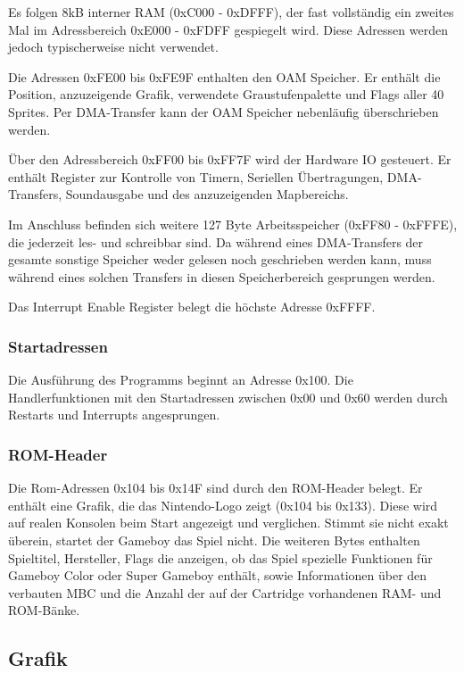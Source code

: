 \documentclass[a4paper]{scrartcl}
\begin{document}
Es folgen 8kB interner RAM (0xC000 - 0xDFFF), der fast vollständig ein zweites Mal im Adressbereich 0xE000 - 0xFDFF gespiegelt wird. Diese Adressen werden jedoch typischerweise nicht verwendet.

Die Adressen 0xFE00 bis 0xFE9F enthalten den OAM Speicher. Er enthält die Position, anzuzeigende Grafik, verwendete Graustufenpalette und Flags aller 40 Sprites. Per DMA-Transfer kann der OAM Speicher nebenläufig überschrieben werden.

Über den Adressbereich 0xFF00 bis 0xFF7F wird der Hardware IO gesteuert. Er enthält Register zur Kontrolle von Timern, Seriellen Übertragungen, DMA-Transfers, Soundausgabe und des anzuzeigenden Mapbereichs.

Im Anschluss befinden sich weitere 127 Byte Arbeitsspeicher (0xFF80 - 0xFFFE), die jederzeit les- und schreibbar sind. Da während eines DMA-Transfers der gesamte sonstige Speicher weder gelesen noch geschrieben werden kann, muss während eines solchen Transfers in diesen Speicherbereich gesprungen werden.

Das Interrupt Enable Register belegt die höchste Adresse 0xFFFF.

\subsubsection{Startadressen}

Die Ausführung des Programms beginnt an Adresse 0x100. Die Handlerfunktionen mit den Startadressen zwischen 0x00 und 0x60 werden durch Restarts und Interrupts angesprungen. 

\subsubsection{ROM-Header}

Die Rom-Adressen 0x104 bis 0x14F sind durch den ROM-Header belegt. Er enthält eine Grafik, die das Nintendo-Logo zeigt (0x104 bis 0x133). Diese wird auf realen Konsolen beim Start angezeigt und verglichen. Stimmt sie nicht exakt überein, startet der Gameboy das Spiel nicht. Die weiteren Bytes enthalten Spieltitel, Hersteller, Flags die anzeigen, ob das Spiel spezielle Funktionen für Gameboy Color oder Super Gameboy enthält, sowie Informationen über den verbauten MBC und die Anzahl der auf der Cartridge vorhandenen RAM- und ROM-Bänke.
\subsection{Grafik}
\end{document}
